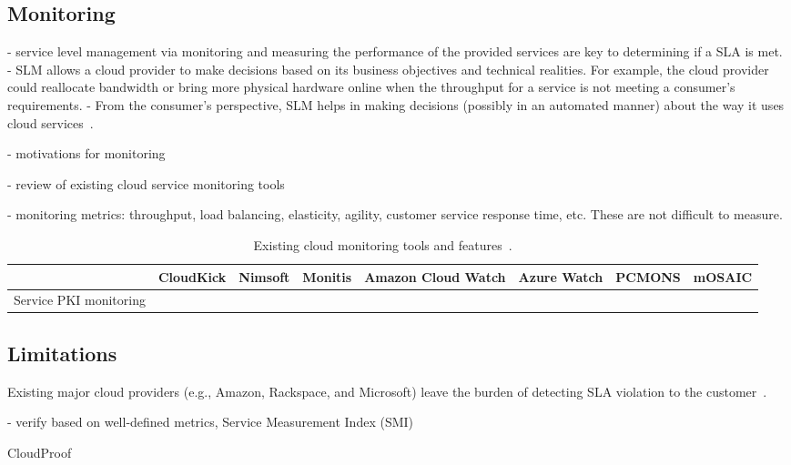 \subsection{Monitoring} \label{sect:sla-monitoring}

- service level management via monitoring and measuring the performance of the provided services are key to determining if a SLA is met.
- SLM allows a cloud provider to make decisions based on its business objectives and technical realities. For example, the cloud provider could reallocate bandwidth or bring more physical hardware online when the throughput for a service is not meeting a consumer's requirements.
- From the consumer's perspective, SLM helps in making decisions (possibly in an automated manner) about the way it uses cloud services~\cite{Ahr+10}.


- motivations for monitoring~\cite{DLN12,EFN+12}

- review of existing cloud service monitoring tools~\cite{ABD+13,FEH+14}

- monitoring metrics: throughput, load balancing, elasticity, agility, customer service response time, etc. These are not difficult to measure.

\begin{table*}[htb]\centering \small
\caption{Existing cloud monitoring tools and features~\cite{ABD+13,FEH+14}.}
\label{tab:monitoring-tools}
  \begin{tabular}{lccccccc}
     \toprule
     & CloudKick & Nimsoft & Monitis & Amazon Cloud Watch & Azure Watch & PCMONS & mOSAIC \\
     \midrule
     Service PKI monitoring &&&&&&& \\
    \bottomrule
  \end{tabular}
\end{table*}

\subsection{Limitations} \label{sect:sla-limitations}

Existing major cloud providers (e.g., Amazon, Rackspace, and Microsoft) leave the burden of detecting SLA violation to the customer~\cite{Bas12}.

- verify based on well-defined metrics, Service Measurement Index (SMI)

CloudProof~\cite{PLM+11}


